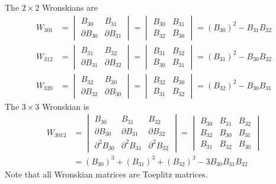The $2 \times 2$ Wronskians are
\begin{align}
    W_{301} &= \begin{vmatrix}
        B_{30} & B_{31} \\ \partial B_{30} & \partial B_{31}
    \end{vmatrix} = \begin{vmatrix}
        B_{30} & B_{31} \\ B_{32} & B_{30}
    \end{vmatrix} = \left(B_{30}\right)^{2} - B_{31} B_{32} \\
    W_{312} &= \begin{vmatrix}
        B_{31} & B_{32} \\ \partial B_{31} & \partial B_{32}
    \end{vmatrix} = \begin{vmatrix}
        B_{31} & B_{32} \\ B_{30} & B_{31}
    \end{vmatrix} = \left(B_{31}\right)^{2} - B_{30} B_{32} \\
    W_{320} &= \begin{vmatrix}
        B_{32} & B_{30} \\ \partial B_{32} & \partial B_{30}
    \end{vmatrix} = \begin{vmatrix}
        B_{32} & B_{30} \\ B_{31} & B_{32}
    \end{vmatrix} = \left(B_{32}\right)^{2} - B_{30} B_{31}
\end{align}
The $3 \times 3$ Wronskian is
\begin{align}
    W_{3012} &= \begin{vmatrix}
        B_{30} & B_{31} & B_{32} \\ \partial B_{30} & \partial B_{31} & \partial B_{32} \\ \partial^{2} B_{30} & \partial^{2} B_{31} & \partial^{2} B_{32}
    \end{vmatrix} = \begin{vmatrix}
        B_{30} & B_{31} & B_{32} \\ B_{32} & B_{30} & B_{31} \\ B_{31} & B_{32} & B_{30}
    \end{vmatrix} \\
    &= \left( B_{30} \right)^{3} + \left( B_{31} \right)^{3} + \left( B_{32} \right)^{3} - 3 B_{30} B_{31} B_{32}
\end{align}
Note that all Wronskian matrices are Toeplitz matrices.
